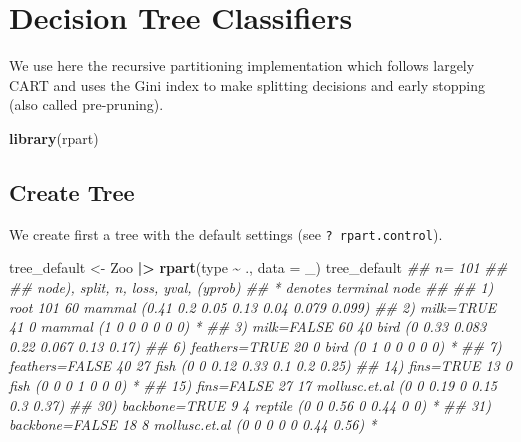\documentclass[
  notitlepage]{book}
\newenvironment{Shaded}{\begin{snugshade}}{\end{snugshade}}
\newcommand{\CommentTok}[1]{\textcolor[rgb]{0.56,0.35,0.01}{\textit{#1}}}
\newcommand{\DataTypeTok}[1]{\textcolor[rgb]{0.13,0.29,0.53}{#1}}
\newcommand{\ErrorTok}[1]{\textcolor[rgb]{0.64,0.00,0.00}{\textbf{#1}}}
\newcommand{\KeywordTok}[1]{\textcolor[rgb]{0.13,0.29,0.53}{\textbf{#1}}}
\newcommand{\NormalTok}[1]{#1}
\newcommand{\OperatorTok}[1]{\textcolor[rgb]{0.81,0.36,0.00}{\textbf{#1}}}
\newcommand{\StringTok}[1]{\textcolor[rgb]{0.31,0.60,0.02}{#1}}
\begin{document}
\hypertarget{decision-tree-classifiers}{%
\section{Decision Tree Classifiers}\label{decision-tree-classifiers}}

We use here the recursive partitioning implementation which follows largely
CART and uses the Gini index to make
splitting decisions and early stopping (also called pre-pruning).

\begin{Shaded}
\begin{Highlighting}[]
\KeywordTok{library}\NormalTok{(rpart)}
\end{Highlighting}
\end{Shaded}

\hypertarget{create-tree}{%
\subsection{Create Tree}\label{create-tree}}

We create first a tree with the default settings (see \texttt{?\ rpart.control}).

\begin{Shaded}
\begin{Highlighting}[]
\NormalTok{tree\_default \textless{}{-}}\StringTok{ }\NormalTok{Zoo }\OperatorTok{|}\ErrorTok{\textgreater{}}\StringTok{ }
\StringTok{  }\KeywordTok{rpart}\NormalTok{(type }\OperatorTok{\textasciitilde{}}\StringTok{ }\NormalTok{., }\DataTypeTok{data =}\NormalTok{ \_)}
\NormalTok{tree\_default}
\CommentTok{\#\# n= 101 }
\CommentTok{\#\# }
\CommentTok{\#\# node), split, n, loss, yval, (yprob)}
\CommentTok{\#\#       * denotes terminal node}
\CommentTok{\#\# }
\CommentTok{\#\#  1) root 101 60 mammal (0.41 0.2 0.05 0.13 0.04 0.079 0.099)  }
\CommentTok{\#\#    2) milk=TRUE 41  0 mammal (1 0 0 0 0 0 0) *}
\CommentTok{\#\#    3) milk=FALSE 60 40 bird (0 0.33 0.083 0.22 0.067 0.13 0.17)  }
\CommentTok{\#\#      6) feathers=TRUE 20  0 bird (0 1 0 0 0 0 0) *}
\CommentTok{\#\#      7) feathers=FALSE 40 27 fish (0 0 0.12 0.33 0.1 0.2 0.25)  }
\CommentTok{\#\#       14) fins=TRUE 13  0 fish (0 0 0 1 0 0 0) *}
\CommentTok{\#\#       15) fins=FALSE 27 17 mollusc.et.al (0 0 0.19 0 0.15 0.3 0.37)  }
\CommentTok{\#\#         30) backbone=TRUE 9  4 reptile (0 0 0.56 0 0.44 0 0) *}
\CommentTok{\#\#         31) backbone=FALSE 18  8 mollusc.et.al (0 0 0 0 0 0.44 0.56) *}
\end{Highlighting}
\end{Shaded}
\end{document}
